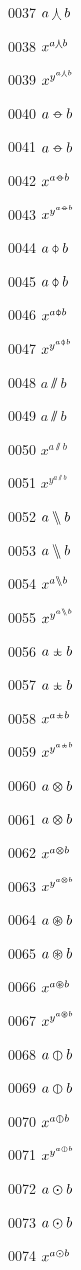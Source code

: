 \documentclass{article}
\begin{document}
0037 $\displaystyle a\varcurlywedge b$\par
0038 $x^{a\varcurlywedge b}$\par
0039 $x^{y^{a\varcurlywedge b}}$\par
0040 $a\minuso b$\par
0041 $\displaystyle a\minuso b$\par
0042 $x^{a\minuso b}$\par
0043 $x^{y^{a\minuso b}}$\par
0044 $a\baro b$\par
0045 $\displaystyle a\baro b$\par
0046 $x^{a\baro b}$\par
0047 $x^{y^{a\baro b}}$\par
0048 $a\sslash b$\par
0049 $\displaystyle a\sslash b$\par
0050 $x^{a\sslash b}$\par
0051 $x^{y^{a\sslash b}}$\par
0052 $a\bbslash b$\par
0053 $\displaystyle a\bbslash b$\par
0054 $x^{a\bbslash b}$\par
0055 $x^{y^{a\bbslash b}}$\par
0056 $a\moo b$\par
0057 $\displaystyle a\moo b$\par
0058 $x^{a\moo b}$\par
0059 $x^{y^{a\moo b}}$\par
0060 $a\varotimes b$\par
0061 $\displaystyle a\varotimes b$\par
0062 $x^{a\varotimes b}$\par
0063 $x^{y^{a\varotimes b}}$\par
0064 $a\varoast b$\par
0065 $\displaystyle a\varoast b$\par
0066 $x^{a\varoast b}$\par
0067 $x^{y^{a\varoast b}}$\par
0068 $a\varobar b$\par
0069 $\displaystyle a\varobar b$\par
0070 $x^{a\varobar b}$\par
0071 $x^{y^{a\varobar b}}$\par
0072 $a\varodot b$\par
0073 $\displaystyle a\varodot b$\par
0074 $x^{a\varodot b}$\par
\end{document}
